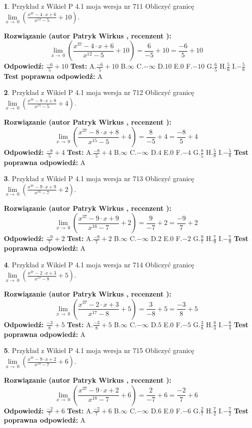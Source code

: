 \documentclass[12pt, a4paper]{article}
\theoremstyle{definition} %
\newtheorem{zad}{}
\newcommand{\zadStart}[1]{\begin{zad}#1\newline}
\newcommand{\zadStop}{\end{zad}}
\newcommand{\rozwStart}[2]{\noindent \textbf{Rozwiązanie (autor #1 , recenzent #2): }\newline}
\newcommand{\rozwStop}{\newline}
\newcommand{\odpStart}{\noindent \textbf{Odpowiedź:}\newline}
\newcommand{\odpStop}{\newline}
\newcommand{\testStart}{\noindent \textbf{Test:}\newline}
\newcommand{\testStop}{\newline}
\newcommand{\kluczStart}{\noindent \textbf{Test poprawna odpowiedź:}\newline}
\newcommand{\kluczStop}{\newline}
\begin{document}
\zadStart{Przykład z Wikieł P 4.1 moja wersja nr 711}
Obliczyć granicę $\lim\limits_{x\to\ 0}(\frac{x^{37}-4 \cdot x +6}{x^{12}-5}+10)$.
\zadStop
\rozwStart{Patryk Wirkus}{}
$$\lim\limits_{x\to\ 0}(\frac{x^{37}-4 \cdot x +6}{x^{12}-5}+10)=\frac{6}{-5}+10=\frac{-6}{5}+10$$
\rozwStop
\odpStart
$\frac{-6}{5}+10$
\odpStop
\testStart
A.$\frac{-6}{5}+10$
B.$\infty$
C.$-\infty$
D.$10$
E.$0$
F.$-10$
G.$\frac{6}{5}$
H.$\frac{5}{6}$
I.$-\frac{5}{6}$
\testStop
\kluczStart
A
\kluczStop



\zadStart{Przykład z Wikieł P 4.1 moja wersja nr 712}
Obliczyć granicę $\lim\limits_{x\to\ 0}(\frac{x^{37}-8 \cdot x +8}{x^{15}-5}+4)$.
\zadStop
\rozwStart{Patryk Wirkus}{}
$$\lim\limits_{x\to\ 0}(\frac{x^{37}-8 \cdot x +8}{x^{15}-5}+4)=\frac{8}{-5}+4=\frac{-8}{5}+4$$
\rozwStop
\odpStart
$\frac{-8}{5}+4$
\odpStop
\testStart
A.$\frac{-8}{5}+4$
B.$\infty$
C.$-\infty$
D.$4$
E.$0$
F.$-4$
G.$\frac{8}{5}$
H.$\frac{5}{8}$
I.$-\frac{5}{8}$
\testStop
\kluczStart
A
\kluczStop



\zadStart{Przykład z Wikieł P 4.1 moja wersja nr 713}
Obliczyć granicę $\lim\limits_{x\to\ 0}(\frac{x^{37}-9 \cdot x +9}{x^{16}-7}+2)$.
\zadStop
\rozwStart{Patryk Wirkus}{}
$$\lim\limits_{x\to\ 0}(\frac{x^{37}-9 \cdot x +9}{x^{16}-7}+2)=\frac{9}{-7}+2=\frac{-9}{7}+2$$
\rozwStop
\odpStart
$\frac{-9}{7}+2$
\odpStop
\testStart
A.$\frac{-9}{7}+2$
B.$\infty$
C.$-\infty$
D.$2$
E.$0$
F.$-2$
G.$\frac{9}{7}$
H.$\frac{7}{9}$
I.$-\frac{7}{9}$
\testStop
\kluczStart
A
\kluczStop



\zadStart{Przykład z Wikieł P 4.1 moja wersja nr 714}
Obliczyć granicę $\lim\limits_{x\to\ 0}(\frac{x^{37}-2 \cdot x +3}{x^{17}-8}+5)$.
\zadStop
\rozwStart{Patryk Wirkus}{}
$$\lim\limits_{x\to\ 0}(\frac{x^{37}-2 \cdot x +3}{x^{17}-8}+5)=\frac{3}{-8}+5=\frac{-3}{8}+5$$
\rozwStop
\odpStart
$\frac{-3}{8}+5$
\odpStop
\testStart
A.$\frac{-3}{8}+5$
B.$\infty$
C.$-\infty$
D.$5$
E.$0$
F.$-5$
G.$\frac{3}{8}$
H.$\frac{8}{3}$
I.$-\frac{8}{3}$
\testStop
\kluczStart
A
\kluczStop



\zadStart{Przykład z Wikieł P 4.1 moja wersja nr 715}
Obliczyć granicę $\lim\limits_{x\to\ 0}(\frac{x^{37}-9 \cdot x +2}{x^{18}-7}+6)$.
\zadStop
\rozwStart{Patryk Wirkus}{}
$$\lim\limits_{x\to\ 0}(\frac{x^{37}-9 \cdot x +2}{x^{18}-7}+6)=\frac{2}{-7}+6=\frac{-2}{7}+6$$
\rozwStop
\odpStart
$\frac{-2}{7}+6$
\odpStop
\testStart
A.$\frac{-2}{7}+6$
B.$\infty$
C.$-\infty$
D.$6$
E.$0$
F.$-6$
G.$\frac{2}{7}$
H.$\frac{7}{2}$
I.$-\frac{7}{2}$
\testStop
\kluczStart
A
\kluczStop
\end{document}
